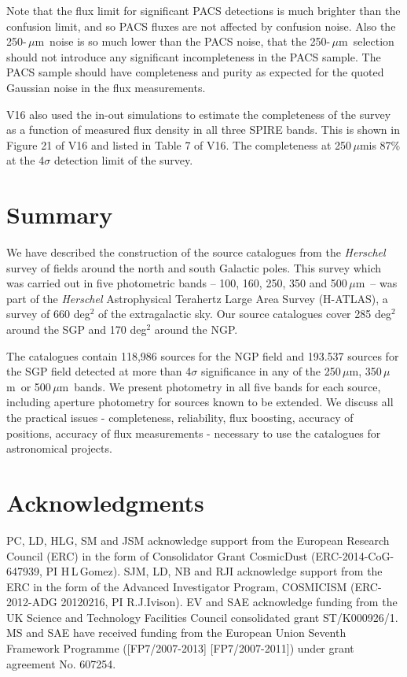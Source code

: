 \documentclass[a4paper,fleqn,usenatbib, twocolumn]{aastex61}
\def\mic{\,$\mu $m}
\begin{document}
Note that the flux limit for significant PACS detections is much
brighter than the confusion limit, and so PACS fluxes are not affected
by confusion noise. Also the 250-\mic\ noise 
is so much lower than the PACS noise, that the  250-\mic\ selection should
not introduce any significant incompleteness in the PACS sample.
The PACS sample should have completeness and purity as expected for
the quoted Gaussian noise in the flux measurements. 


V16 also used the in-out simulations to estimate the completeness of
the survey as a function of measured flux density in all three SPIRE
bands. This is shown in Figure 21 of V16 and listed in Table 7 of
V16. The completeness at 250\mic is 87\% at the 4$\sigma$
detection limit of the survey.



\section{Summary}

We have described the construction of the source catalogues from the
{\it Herschel} survey of fields around the north and south Galactic
poles. This survey which was carried out in five photometric bands --
100, 160, 250, 350 and 500\mic\ -- was part of the {\it Herschel}
Astrophysical Terahertz Large Area Survey (H-ATLAS), a survey of 660
deg$^2$ of the extragalactic sky. Our source catalogues cover 285
deg$^2$ around the SGP and 170 deg$^2$ around the NGP.

The catalogues contain 118,986 sources for the NGP field and 193.537
sources for the SGP field detected at more than 4$\sigma$ significance
in any of the 250\mic, 350\mic\ or 500\mic\ bands. We present 
photometry in all five bands for each source, including aperture
photometry for sources known to be extended. We discuss all the
practical issues - completeness, reliability, flux boosting, accuracy
of positions, accuracy of flux measurements - necessary to use the
catalogues for astronomical projects.

\section*{Acknowledgments}

PC, LD, HLG, SM and JSM acknowledge support from the European Research
Council (ERC) in the form of Consolidator Grant {\sc CosmicDust}
(ERC-2014-CoG-647939, PI H\,L\,Gomez).  SJM, LD, NB and RJI acknowledge
support from the ERC in the form of the Advanced Investigator Program,
COSMICISM (ERC-2012-ADG 20120216, PI R.J.Ivison).  EV and SAE
acknowledge funding from the UK Science and Technology Facilities
Council consolidated grant ST/K000926/1.  MS and SAE have received
funding from the European Union Seventh Framework Programme
([FP7/2007-2013] [FP7/2007-2011]) under grant agreement No. 607254.
\end{document}
